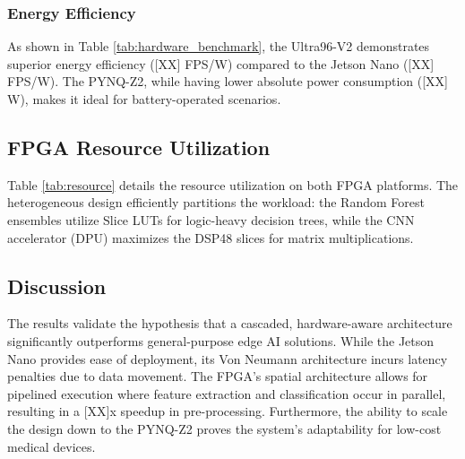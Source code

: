 \subsubsection{Energy Efficiency}
As shown in Table \ref{tab:hardware_benchmark}, the Ultra96-V2 demonstrates superior energy efficiency ([XX] FPS/W) compared to the Jetson Nano ([XX] FPS/W). The PYNQ-Z2, while having lower absolute power consumption ([XX] W), makes it ideal for battery-operated scenarios.

\subsection{FPGA Resource Utilization}
Table \ref{tab:resource} details the resource utilization on both FPGA platforms. The heterogeneous design efficiently partitions the workload: the Random Forest ensembles utilize Slice LUTs for logic-heavy decision trees, while the CNN accelerator (DPU) maximizes the DSP48 slices for matrix multiplications.



\subsection{Discussion}
The results validate the hypothesis that a cascaded, hardware-aware architecture significantly outperforms general-purpose edge AI solutions. While the Jetson Nano provides ease of deployment, its Von Neumann architecture incurs latency penalties due to data movement. The FPGA's spatial architecture allows for pipelined execution where feature extraction and classification occur in parallel, resulting in a [XX]x speedup in pre-processing. Furthermore, the ability to scale the design down to the PYNQ-Z2 proves the system's adaptability for low-cost medical devices.
